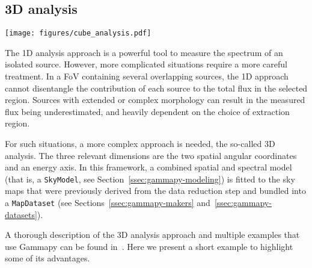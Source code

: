\documentclass[longauth]{aa}
\newcommand{\code}[1]{\texttt{#1}}
\newcommand{\gammapy}{Gammapy\xspace}
\newcommand{\cta}{CTA\xspace}
\newcommand{\irfs}{IRFs\xspace}
\begin{document}
\subsection{3D analysis}
\label{ssec:3d-analysis}
%
\begin{figure*}[t]
        \centering
        \texttt{[image: figures/cube\_analysis.pdf]}
        \caption{Example of a 3D analysis for simulated sources with point-like, Gaussian
                and shell-like morphologies. The simulation uses \enquote{prod5} \irfs from \cta
                \citep{CtaProd5}.
                The left image shows a significance map (using the \emph{Cash} statistics)
                where the three simulated sources can be seen. The middle figure shows another significance map,
                but this time after
                subtracting the best-fit model for each of the sources, which are displayed in
                black. The right figure shows the contribution of each source model to the
                circular region of radius 0.5\textdegree~drawn in the left image, together with
                the excess counts inside that region. }
        \label{fig:cube_analysis}
\end{figure*}
%
The 1D analysis approach is a powerful tool to measure the spectrum of an
isolated source. However, more complicated situations require a more careful
treatment. In a FoV containing several overlapping sources, the 1D
approach cannot disentangle the contribution of each source to the total flux in
the selected region. Sources with extended or complex morphology can result in
the measured flux being underestimated, and heavily dependent on the choice of
extraction region.

For such situations, a more complex approach is needed, the so-called 3D
analysis. The three relevant dimensions are the two spatial angular coordinates
and an energy axis. In this framework, a combined spatial and spectral model
(that is, a \code{SkyModel}, see Section~\ref{ssec:gammapy-modeling}) is fitted to the
sky maps that were previously derived from the data reduction step and bundled into a
\code{MapDataset} (see Sections~\ref{ssec:gammapy-makers} and~\ref{ssec:gammapy-datasets}).

A thorough description of the 3D analysis approach and multiple examples that
use \gammapy can be found in~\cite{Mohrmann2019}. Here we present a short
example to highlight some of its advantages.
\end{document}
